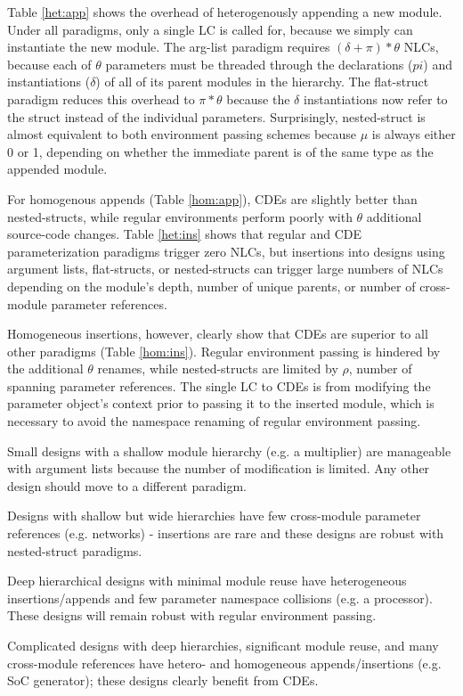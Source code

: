 Table \ref{het:app} shows the overhead of heterogenously appending a new module.
Under all paradigms, only a single LC is called for, because we simply can instantiate the new module.
The arg-list paradigm requires $(\delta+\pi)*\theta$ NLCs, because each of $\theta$ parameters must be threaded through the declarations ($pi$) and instantiations ($\delta$) of all of its parent modules in the hierarchy.
The flat-struct paradigm reduces this overhead to $\pi*\theta$ because the $\delta$ instantiations now refer to the struct instead of the individual parameters.
Surprisingly, nested-struct is almost equivalent to both environment passing schemes because $\mu$ is always either 0 or 1, depending on whether the immediate parent is of the same type as the appended module.

For homogenous appends (Table \ref{hom:app}), CDEs are slightly better than nested-structs, while regular environments perform poorly with $\theta$ additional source-code changes.
Table \ref{het:ins} shows that regular and CDE parameterization paradigms trigger zero NLCs,
but insertions into designs using argument lists, flat-structs, or nested-structs can trigger large numbers of NLCs depending on the module's depth, number of unique parents, or number of cross-module parameter references.

Homogeneous insertions, however, clearly show that CDEs are superior to all other paradigms (Table \ref{hom:ins}).
Regular environment passing is hindered by the additional $\theta$ renames, while nested-structs are limited by $\rho$, number of spanning parameter references. 
The single LC to CDEs is from modifying the parameter object's context prior to passing it to the inserted module, which is necessary to avoid the namespace renaming of regular environment passing.


Small designs with a shallow module hierarchy (e.g. a multiplier) are manageable with argument lists because the number of modification is limited. Any other design should move to a different paradigm.

Designs with shallow but wide hierarchies have few cross-module parameter references (e.g. networks) - insertions are rare and these designs are robust with nested-struct paradigms.

Deep hierarchical designs with minimal module reuse have heterogeneous insertions/appends and few parameter namespace collisions (e.g. a processor). These designs will remain robust with regular environment passing.

Complicated designs with deep hierarchies, significant module reuse, and many cross-module references have hetero- and homogeneous appends/insertions (e.g. SoC generator); these designs clearly benefit from CDEs.


